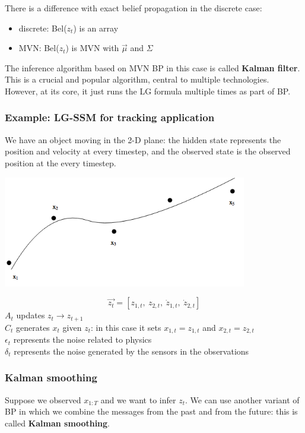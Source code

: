 \documentclass{article}
\begin{document}
There is a difference with exact belief propagation in the discrete case:
\begin{itemize}
    \item discrete: Bel($z_t$) is an array
    \item MVN: Bel($z_t$) is MVN with $\vec{\mu}$ and $\Sigma$
\end{itemize}

The inference algorithm based on MVN BP in this case is called \textbf{Kalman filter}. 
This is a crucial and popular algorithm, central to multiple technologies. However, at its core, it just runs the LG formula multiple times as part of BP. 

\subsubsection{Example: LG-SSM for tracking application}

We have an object moving in the 2-D plane: the hidden state represents the position and velocity at every timestep, and the observed state is the observed position at the every timestep.

\begin{center}
\includegraphics[width=0.8\textwidth]{Drawing_kalman_filter.png}
\end{center}

\[ \vec{z_t} = [ z_{1, t},~z_{2, t},~\dot{z}_{1, t},~\dot{z}_{2, t}] \]
$A_t$ updates $z_t \rightarrow z_{t+1}$\\
$C_t$ generates $x_t$ given $z_t$: in this case it sets $x_{1, t} = z_{1, t}$ and $x_{2, t} = z_{2, t}$\\
$\epsilon_t$ represents the noise related to physics\\
$\delta_t$ represents the noise generated by the sensors in the observations\\

\subsubsection{Kalman smoothing}
Suppose we observed $x_{1:T}$ and we want to infer $z_t$. We can use another variant of BP in which we combine the messages from the past and from the future: this is called \textbf{Kalman smoothing}.
\end{document}
